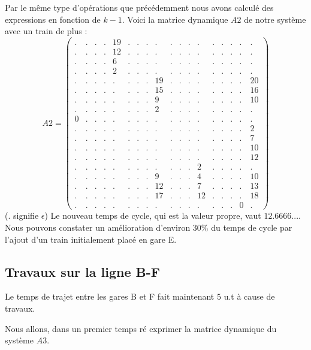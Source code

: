 Par le même type d'opérations que précédemment nous avons calculé des expressions en fonction de $k-1$.
Voici la matrice dynamique $A2$ de notre système avec un train de plus :
\begin{equation}
A2 = \left(\begin{array}{cccccccccccccccccc}
. & . & . & . & 19 & . & . & . & . &  . & . & . & . &  . & . & . & . & .  \\
. & . & . & . & 12 & . & . & . & . &  . & . & . & . &  . & . & . & . & .  \\
. & . & . & . & 6 &  . & . & . & . &  . & . & . & . &  . & . & . & . & .  \\
. & . & . & . & 2 &  . & . & . & . &  . & . & . & . &  . & . & . & . & .  \\
. & . & . & . & . &  . & . & . & 19 & . & . & . & . &  . & . & . & . & 20  \\
. & . & . & . & . &  . & . & . & 15 & . & . & . & . &  . & . & . & . & 16  \\
. & . & . & . & . &  . & . & . & 9 &  . & . & . & . &  . & . & . & . & 10  \\
. & . & . & . & . &  . & . & . & 2 &  . & . & . & . &  . & . & . & . & .  \\
0 & . & . & . & . &  . & . & . & . &  . & . & . & . &  . & . & . & . & .  \\
. & . & . & . & . &  . & . & . & . &  . & . & . & . &  . & . & . & . & 2  \\
. & . & . & . & . &  . & . & . & . &  . & . & . & . &  . & . & . & . & 7  \\
. & . & . & . & . &  . & . & . & . &  . & . & . & . &  . & . & . & . & 10  \\
. & . & . & . & . &  . & . & . & . &  . & . & . & . &  . & . & . & . & 12  \\
. & . & . & . & . &  . & . & . & . &  . & . & . & 2 &  . & . & . & . & .  \\
. & . & . & . & . &  . & . & . & 9 &  . & . & . & 4 &  . & . & . & . & 10  \\
. & . & . & . & . &  . & . & . & 12 & . & . & . & 7 &  . & . & . & . & 13  \\
. & . & . & . & . &  . & . & . & 17 & . & . & . & 12 & . & . & . & . & 18  \\
. & . & . & . & . &  . & . & . & . &  . & . & . & . &  . & . & . & 0 & .      
\end{array}\right)
\end{equation}
($.$ signifie $\epsilon$)
Le nouveau temps de cycle, qui est la valeur propre, vaut $ 12.6666...$. Nous pouvons constater un amélioration d'environ $30\%$ du temps de cycle par l'ajout d'un train initialement placé en gare E.

\subsection{Travaux sur la ligne B-F}
Le temps de trajet entre les gares B et F fait maintenant $5$ u.t à cause de travaux.

Nous allons, dans un premier temps ré exprimer la matrice dynamique du système $A3$.


